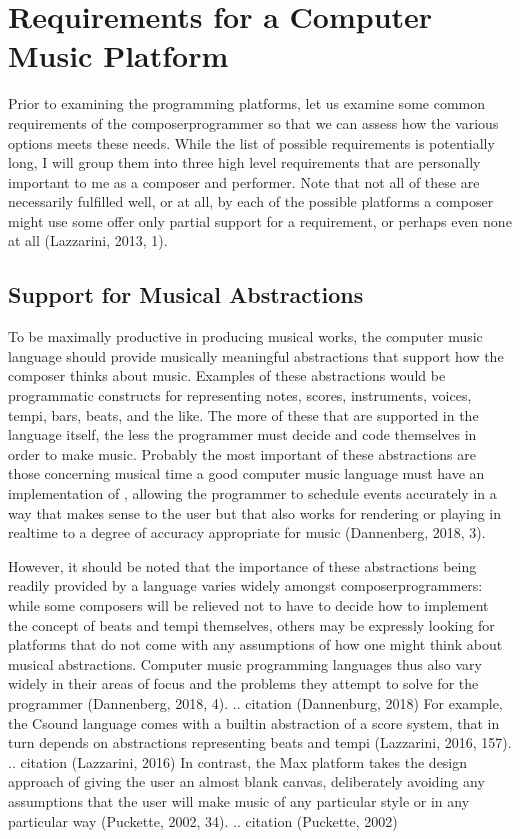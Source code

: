 \documentclass[letterpaper,10pt,english]{sphinxmanual}
\begin{document}
\section{Requirements for a Computer Music Platform}
\label{\detokenize{background:requirements-for-a-computer-music-platform}}
\sphinxAtStartPar
Prior to examining the programming platforms, let us examine some
common requirements of the composer\sphinxhyphen{}programmer so that we can assess how the various
options meets these needs.
While the list of possible requirements is potentially long, I will group
them into three high level requirements that are personally important to me as
a composer and performer. Note that not all of these are necessarily fulfilled well, or at all,
by each of the possible platforms a composer might use \sphinxhyphen{} some offer
only partial support for a requirement, or perhaps even none at all (Lazzarini, 2013, 1).


\subsection{Support for Musical Abstractions}
\label{\detokenize{background:support-for-musical-abstractions}}
\sphinxAtStartPar
To be maximally productive in producing musical works, the computer music language should provide
musically meaningful abstractions that support how the composer thinks about music.
Examples of these abstractions would be programmatic constructs for representing
notes, scores, instruments, voices, tempi, bars, beats, and the like.
The more of these that are supported in the language itself, the less the programmer
must decide and code themselves in order to make music.
Probably the most important of these abstractions are those concerning musical time
\sphinxhyphen{} a good computer music language must have an implementation of ,
allowing the programmer to schedule events accurately in a way that makes sense
to the user but that also works for rendering or playing in real\sphinxhyphen{}time to a degree of accuracy
appropriate for music (Dannenberg, 2018, 3).

\sphinxAtStartPar
However, it should be noted that the importance of these abstractions being readily provided
by a language varies widely amongst composer\sphinxhyphen{}programmers:
while some composers will be relieved not to have to decide how to implement
the concept of beats and tempi themselves, others may be expressly looking for platforms
that do not come with any assumptions of how one might think about musical abstractions.
Computer music programming languages thus also vary widely in their areas
of focus and the problems they attempt to solve for the programmer (Dannenberg, 2018, 4).
.. citation (Dannenburg, 2018)
For example, the Csound language comes with a built\sphinxhyphen{}in abstraction of a score system,
that in turn depends on abstractions representing beats and tempi (Lazzarini, 2016, 157).
.. citation (Lazzarini, 2016)
In contrast, the Max platform takes the design approach of giving the user
an almost blank canvas, deliberately avoiding any assumptions that the user
will make music of any particular style or in any particular way (Puckette, 2002, 34).
.. citation (Puckette, 2002)
\end{document}
